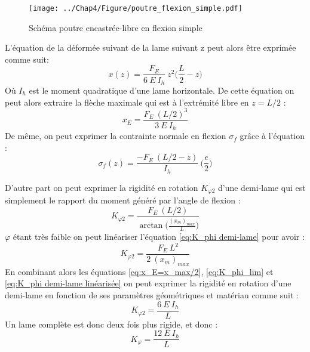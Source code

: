 \begin{figure}[!htbp]
\begin{center}
    \captionsetup{justification=centering}
	\texttt{[image: ../Chap4/Figure/poutre\_flexion\_simple.pdf]}
	\caption{Schéma poutre encastrée-libre en flexion simple}
	\label{fig:poutre_flexion_simple}
\end{center}
\end{figure}
L'équation de la déformée suivant de la lame suivant z peut alors être exprimée comme suit:
\begin{equation}
		x(z) = \frac{F_E}{6\ E\ I_h}\ z^2 \biggl( \frac{L}{2} - z \biggr)
\label{eq:deformée_encastrée-libre}
\end{equation} 
Où $I_h$ est le moment quadratique d'une lame horizontale. De cette équation on peut alors extraire la flèche maximale qui est à l'extrémité libre en $z=L/2$ :
\begin{equation}
		x_E = \frac{F_E\ (L/2)^3}{3\ E\ I_h}
\label{eq:fleche_encastrée-libre}
\end{equation} 	
De même, on peut exprimer la contrainte normale en flexion $\sigma _f$ grâce à l'équation :
\begin{equation}
	\sigma _f(z) = \frac{-F_E\ (L/2 - z)}{I_h}\ \biggl( \frac{e}{2} \biggr)
\end{equation}

D'autre part on peut exprimer la rigidité en rotation $K_{\varphi 2}$ d'une demi-lame qui est simplement le rapport du moment généré par l'angle de flexion :
\begin{equation}
		K_{\varphi 2} =  \frac{F_E\ (L/2)}{\arctan \biggl( \frac{(x_m)_{max}}{L} \biggr)}
\label{eq:K_phi demi-lame}
\end{equation}
$\varphi$ étant très faible on peut linéariser l'équation  \ref{eq:K_phi demi-lame} pour avoir :
\begin{equation}
		K_{\varphi 2} =  \frac{F_E\ L^2}{2\ (x_m)_{max}}
\label{eq:K_phi demi-lame linéarisée}
\end{equation}
En combinant alors les équations \ref{eq:x_E=x_max/2}, \ref{eq:K_phi_lim} et \ref{eq:K_phi demi-lame linéarisée} on peut exprimer la rigidité en rotation d'une demi-lame en fonction de ses paramètres géométriques et matériau comme suit :
\begin{equation}
		K_{\varphi 2} = \frac{6\ E\ I_h}{L}
		\label{eq:K_phi demi-lame final}
\end{equation}
Un lame complète est donc deux fois plus rigide, et donc :
\begin{equation}
		K_{\varphi} = \frac{12\ E\ I_h}{L}
		\label{eq:K_phi lame entière final}
\end{equation}